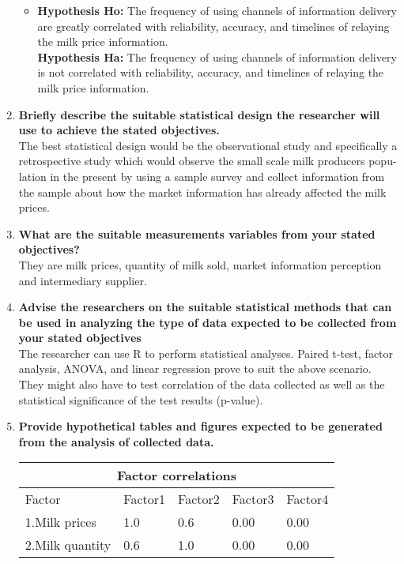 \documentclass[11pt]{article}
\begin{document}
\begin{enumerate}
\begin{itemize}
  \item \textbf{Hypothesis Ho:} The frequency of using channels of information delivery are
    greatly correlated with reliability, accuracy, and timelines of relaying the milk price information. \\
    \textbf{Hypothesis Ha:} The frequency of using channels of information delivery is not correlated with reliability, accuracy, and timelines of relaying the milk price information.
  \end{itemize}
\item \textbf{Briefly describe the suitable statistical design the researcher will
  use to achieve the stated objectives.} \\
   The best statistical design would be the observational study and specifically
a retrospective study which would observe the small scale milk producers popu-
lation in the present by using a sample survey and collect information from the
sample about how the market information has already affected the milk prices.
\item \textbf{What are the suitable measurements variables from your stated objectives?} \\
They are milk prices, quantity of milk sold, market information perception and intermediary supplier.
\item \textbf{Advise the researchers on the suitable statistical methods that can
be used in analyzing the type of data expected to be collected from
your stated objectives} \\
The researcher can use R to perform statistical analyses. Paired t-test,
factor analysis, ANOVA, and linear regression prove to suit the above scenario.
They might also have to test correlation of the data collected as well
as the statistical significance of the test results (p-value).
\item \textbf{Provide hypothetical tables and figures expected to be generated from the analysis of collected data.} \\
  \begin{table}[htbp]
    \centering
    \begin{tabular}{|l|l|l|l|l|}
      \hline
      \multicolumn{5}{|c|}{Factor correlations} \\[2mm] \hline
      Factor&Factor1&Factor2&Factor3&Factor4\\ [4mm] \hline
      1.Milk prices&1.0&0.6&0.00&0.00 \\[4mm] \hline
      2.Milk quantity&0.6&1.0&0.00&0.00 \\[4mm]\hline

\end{tabular}
\end{table}
\end{enumerate}
\end{document}
